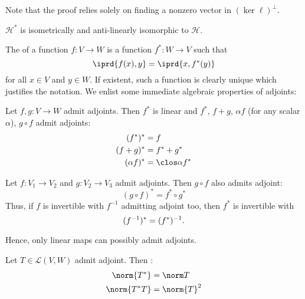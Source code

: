 	\begin{rmk}
		Note that the proof relies solely on finding a nonzero vector in $(\ker\ell)^\perp$.
	\end{rmk}
	
	\begin{cor}
		$\mathscr H^*$ is isometrically and anti-linearly isomorphic to $\mathscr H$.
	\end{cor}
	
	The  of a function $f\colon V\to W$ is a function $f^*\colon W\to V$ such that
	\[
	\iprd{f(x), y} = \iprd{x, f^*(y)}
	\]
	for all $x\in V$ and $y\in W$. If existent, such a function is clearly unique which justifies the notation. We enlist some immediate algebraic properties of adjoints:
	
	\begin{cor}
		\leavevmode
		\begin{mylist}
			\item Let $f, g\colon V\to W$ admit adjoints. Then $f^*$ is linear and $f^*$, $f + g$, $\alpha f$ (for any scalar $\alpha$), $g\circ f$ admit adjoints:
			\begin{align*}
				(f^*)^* & = f\\
				(f + g)^* & = f^* + g^*\\
				(\alpha f)^* & = \clos\alpha f^*
			\end{align*}
			
			\item Let $f\colon V_1\to V_2$ and $g\colon V_2\to V_3$ admit adjoints. Then $g\circ f$ also admits adjoint:
			\[
			(g\circ f)^* = f^*\circ g^*
			\]
			Thus, if $f$ is invertible with $f^{-1}$ admitting adjoint too,
			then $f^*$ is invertible with
			\[
			(f^{-1})^* = (f^*)^{-1}\text.
			\]
		\end{mylist}
	\end{cor}
	
	\begin{rmk}
		Hence, only linear maps can possibly admit adjoints.
	\end{rmk}
	
	\begin{prp}
		Let $T\in\mathcal L(V, W)$ admit adjoint. Then \tfh:
		\begin{align*}
			\norm{T^*} & = \norm T\\
			\norm{T^* T} & = \norm{T}^2
		\end{align*}
	\end{prp}
	
